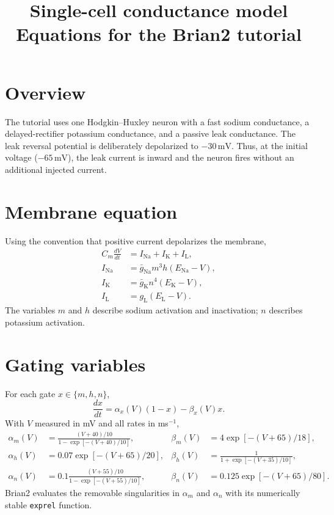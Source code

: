 \documentclass[11pt,a4paper]{article}
\title{Single-cell conductance model\\\large Equations for the Brian2 tutorial}
\author{}
\date{}
\begin{document}
\maketitle

\section*{Overview}
The tutorial uses one Hodgkin--Huxley neuron with a fast sodium conductance,
a delayed-rectifier potassium conductance, and a passive leak conductance. The
leak reversal potential is deliberately depolarized to $-30\,\mathrm{mV}$.
Thus, at the initial voltage ($-65\,\mathrm{mV}$), the leak current is inward
and the neuron fires without an additional injected current.

\section*{Membrane equation}
Using the convention that positive current depolarizes the membrane,
\begin{align}
C_m\frac{dV}{dt} &= I_{\mathrm{Na}}+I_{\mathrm{K}}+I_{\mathrm{L}},\\
I_{\mathrm{Na}} &= \bar g_{\mathrm{Na}}m^3h(E_{\mathrm{Na}}-V),\\
I_{\mathrm{K}} &= \bar g_{\mathrm{K}}n^4(E_{\mathrm{K}}-V),\\
I_{\mathrm{L}} &= g_{\mathrm{L}}(E_{\mathrm{L}}-V).
\end{align}
The variables $m$ and $h$ describe sodium activation and inactivation;
$n$ describes potassium activation.

\section*{Gating variables}
For each gate $x\in\{m,h,n\}$,
\begin{equation}
\frac{dx}{dt}=\alpha_x(V)(1-x)-\beta_x(V)x.
\end{equation}
With $V$ measured in mV and all rates in ms$^{-1}$,
\begin{align}
\alpha_m(V)&=\frac{(V+40)/10}{1-\exp[-(V+40)/10]}, &
\beta_m(V)&=4\exp[-(V+65)/18],\\
\alpha_h(V)&=0.07\exp[-(V+65)/20], &
\beta_h(V)&=\frac{1}{1+\exp[-(V+35)/10]},\\
\alpha_n(V)&=0.1\frac{(V+55)/10}{1-\exp[-(V+55)/10]}, &
\beta_n(V)&=0.125\exp[-(V+65)/80].
\end{align}
Brian2 evaluates the removable singularities in $\alpha_m$ and $\alpha_n$
with its numerically stable \texttt{exprel} function.
\end{document}
